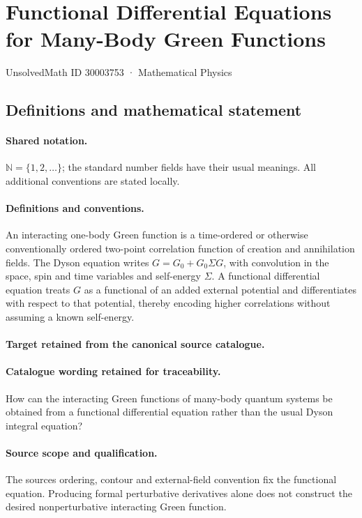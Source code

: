 \documentclass[11pt]{article}
\begin{document}
\setcounter{section}{30003752}
\section{Functional Differential Equations for Many-Body Green Functions}\label{30003753}
{\small UnsolvedMath ID 30003753 · Mathematical Physics}
\subsection{Definitions and mathematical statement}

\paragraph{Shared notation.}$\mathbb N=\{1,2,\ldots\}$; the standard number fields have their usual meanings. All additional conventions are stated locally.


\paragraph{Definitions and conventions.}
An interacting one-body Green function is a time-ordered or otherwise conventionally ordered two-point correlation function of creation and annihilation fields. The Dyson equation writes $G=G_0+G_0\Sigma G$, with convolution in the space, spin and time variables and self-energy $\Sigma$. A functional differential equation treats $G$ as a functional of an added external potential and differentiates with respect to that potential, thereby encoding higher correlations without assuming a known self-energy.

\paragraph{Target retained from the canonical source catalogue.}
\paragraph{Catalogue wording retained for traceability.}
How can the interacting Green functions of many-body quantum systems be obtained from a functional differential equation rather than the usual Dyson integral equation?

\paragraph{Source scope and qualification.}
The source\textquotesingle s ordering, contour and external-field convention fix the functional equation. Producing formal perturbative derivatives alone does not construct the desired nonperturbative interacting Green function.
\end{document}
